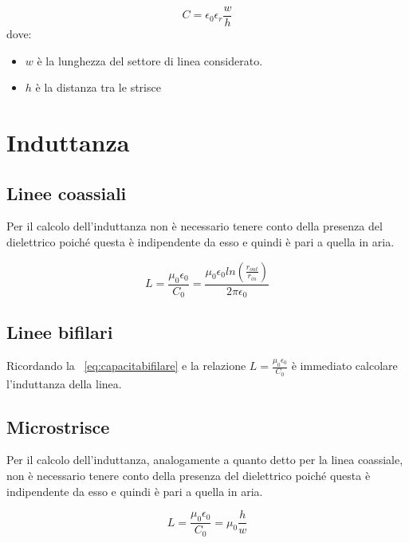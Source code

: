 	 		\begin{equation}
			C=\epsilon_0 \epsilon_r\frac{w}{h}	 			
	 		\end{equation} 
	 		dove:
	 		\begin{itemize}
	 		\item $w$ è la lunghezza del settore di linea considerato.
	 		\item $h$ è la distanza tra le strisce
	 		\end{itemize}


	\section{Induttanza}

		\subsection{Linee coassiali}

			Per il calcolo dell’induttanza non è necessario tenere conto della presenza del dielettrico
			poiché questa è indipendente da esso e quindi è pari a quella in aria.
		
			\begin{equation}
				L=\frac{\mu_0 \epsilon_0}{C_0}=\frac{\mu_0 \epsilon_0 ln (\frac { r_{out}} {r_{in} } )}{2\pi \epsilon_0}
			\end{equation}



		\subsection{Linee bifilari}

		Ricordando la ~\ref{eq:capacitabifilare} e la relazione $L=\frac{\mu_0 \epsilon_0}{C_0}$ è immediato calcolare l'induttanza della linea.

		\subsection{Microstrisce}
			
			Per il calcolo dell’induttanza, analogamente a quanto detto per la linea coassiale, non è necessario tenere conto della presenza del dielettrico
			poiché questa è indipendente da esso e quindi è pari a quella in aria.
		
			\begin{equation}
				L=\frac{\mu_0 \epsilon_0}{C_0}=\mu_0 \frac{h}{w}
			\end{equation}
	


